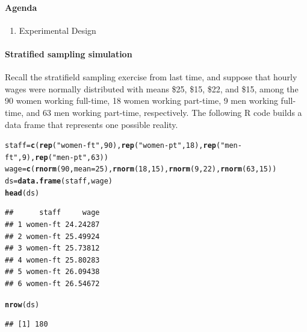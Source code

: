 \documentclass[10pt]{article}\usepackage[]{graphicx}\usepackage[]{color}
\makeatletter
\newcommand{\hlnum}[1]{\textcolor[rgb]{0.686,0.059,0.569}{#1}}%
\newcommand{\hlstr}[1]{\textcolor[rgb]{0.192,0.494,0.8}{#1}}%
\newcommand{\hlstd}[1]{\textcolor[rgb]{0.345,0.345,0.345}{#1}}%
\newcommand{\hlkwb}[1]{\textcolor[rgb]{0.69,0.353,0.396}{#1}}%
\newcommand{\hlkwc}[1]{\textcolor[rgb]{0.333,0.667,0.333}{#1}}%
\newcommand{\hlkwd}[1]{\textcolor[rgb]{0.737,0.353,0.396}{\textbf{#1}}}%
\newenvironment{kframe}{%
 \def\at@end@of@kframe{}%
 \ifinner\ifhmode%
  \def\at@end@of@kframe{\end{minipage}}%
  \begin{minipage}{\columnwidth}%
 \fi\fi%
 \def\FrameCommand##1{\hskip\@totalleftmargin \hskip-\fboxsep
 \colorbox{shadecolor}{##1}\hskip-\fboxsep
     \hskip-\linewidth \hskip-\@totalleftmargin \hskip\columnwidth}%
 \MakeFramed {\advance\hsize-\width
   \@totalleftmargin\z@ \linewidth\hsize
   \@setminipage}}%
 {\par\unskip\endMakeFramed%
 \at@end@of@kframe}
\newenvironment{knitrout}{}{} %
\newcommand{\R}{{\sf R}\xspace}
\makeatother
\begin{document}
\paragraph{Agenda}
\begin{enumerate}
  \itemsep0em
  \item Experimental Design
\end{enumerate}


\paragraph{Stratified sampling simulation}

  Recall the stratifield sampling exercise from last time, and suppose that hourly wages were normally distributed with means \$25, \$15, \$22, and \$15, among the 90 women working full-time, 18 women working part-time, 9 men working full-time, and 63 men working part-time, respectively. The following \R code builds a data frame that represents one possible reality. 

\begin{knitrout}
\color{fgcolor}\begin{kframe}
\begin{alltt}
\hlstd{staff} \hlkwb{=} \hlkwd{c}\hlstd{(}\hlkwd{rep}\hlstd{(}\hlstr{"women-ft"}\hlstd{,} \hlnum{90}\hlstd{),} \hlkwd{rep}\hlstd{(}\hlstr{"women-pt"}\hlstd{,} \hlnum{18}\hlstd{),} \hlkwd{rep}\hlstd{(}\hlstr{"men-ft"}\hlstd{,} \hlnum{9}\hlstd{),} \hlkwd{rep}\hlstd{(}\hlstr{"men-pt"}\hlstd{,} \hlnum{63}\hlstd{))}
\hlstd{wage} \hlkwb{=} \hlkwd{c}\hlstd{(}\hlkwd{rnorm}\hlstd{(}\hlnum{90}\hlstd{,} \hlkwc{mean} \hlstd{=} \hlnum{25}\hlstd{),} \hlkwd{rnorm}\hlstd{(}\hlnum{18}\hlstd{,} \hlnum{15}\hlstd{),} \hlkwd{rnorm}\hlstd{(}\hlnum{9}\hlstd{,} \hlnum{22}\hlstd{),} \hlkwd{rnorm}\hlstd{(}\hlnum{63}\hlstd{,} \hlnum{15}\hlstd{))}
\hlstd{ds} \hlkwb{=} \hlkwd{data.frame}\hlstd{(staff, wage)}
\hlkwd{head}\hlstd{(ds)}
\end{alltt}
\begin{verbatim}
##      staff     wage
## 1 women-ft 24.24287
## 2 women-ft 25.49924
## 3 women-ft 25.73812
## 4 women-ft 25.80283
## 5 women-ft 26.09438
## 6 women-ft 26.54672
\end{verbatim}
\begin{alltt}
\hlkwd{nrow}\hlstd{(ds)}
\end{alltt}
\begin{verbatim}
## [1] 180
\end{verbatim}
\end{kframe}
\end{knitrout}
\end{document}
